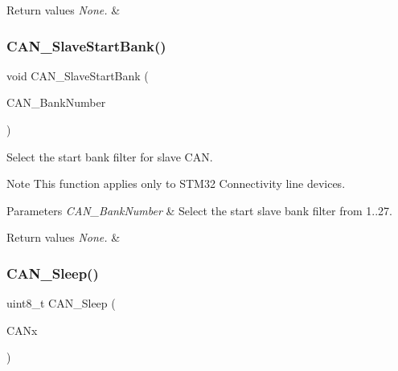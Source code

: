 \begin{DoxyRetVals}{Return values}
{\em None.} & \\
\hline
\end{DoxyRetVals}
\mbox{\label{group___c_a_n___exported___functions_ga109ff8960bc59f44b984c9646f17b3c0}} 
\subsubsection{\texorpdfstring{CAN\_SlaveStartBank()}{CAN\_SlaveStartBank()}}
{\footnotesize\ttfamily void C\+A\+N\+\_\+\+Slave\+Start\+Bank (\begin{DoxyParamCaption}\item[{uint8\+\_\+t}]{C\+A\+N\+\_\+\+Bank\+Number }\end{DoxyParamCaption})}



Select the start bank filter for slave C\+AN. 

\begin{DoxyNote}{Note}
This function applies only to S\+T\+M32 Connectivity line devices. 
\end{DoxyNote}

\begin{DoxyParams}{Parameters}
{\em C\+A\+N\+\_\+\+Bank\+Number} & Select the start slave bank filter from 1..27. \\
\hline
\end{DoxyParams}

\begin{DoxyRetVals}{Return values}
{\em None.} & \\
\hline
\end{DoxyRetVals}
\mbox{\label{group___c_a_n___exported___functions_ga640215e38765759d7eceb8a039046667}} 
\subsubsection{\texorpdfstring{CAN\_Sleep()}{CAN\_Sleep()}}
{\footnotesize\ttfamily uint8\+\_\+t C\+A\+N\+\_\+\+Sleep (\begin{DoxyParamCaption}\item[{\mbox{\hyperlink{struct_c_a_n___type_def}{C\+A\+N\+\_\+\+Type\+Def}} $\ast$}]{C\+A\+Nx }\end{DoxyParamCaption})}



